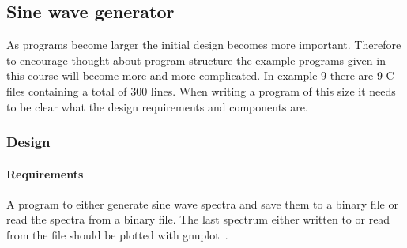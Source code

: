 \documentclass[11pt]{scrartcl}
\begin{document}
\subsection{Sine wave generator}
As programs become larger the initial design becomes more important.
Therefore to encourage thought about program structure the example
programs given in this course will become more and
more complicated.  In  example 9 there are 9 C files containing a
total of 300 lines.  When writing a program of this size it needs to
be clear what the design requirements and components are.

\subsubsection*{Design}

\paragraph{Requirements}
A program to either generate sine wave spectra and save them to a
binary file or read the spectra from a binary file.  The last
spectrum either written to or read from the file should be plotted with
gnuplot~\cite{gnuplot}.
\end{document}
